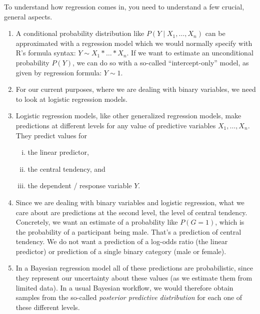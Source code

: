 \documentclass[nobib]{tufte-handout}
\begin{document}
To understand how regression comes in, you need to understand a few crucial, general aspects.
\begin{enumerate}[1.]

  \item A conditional probability distribution like $P(Y \mid X_{1}, \dots, X_{n})$ can be approximated with a regression model which we would normally specify with R's formula syntax: $Y \sim X_{1} * \dots * X_{n}$.
  If we want to estimate an unconditional probability $P(Y)$, we can do so with a so-called ``intercept-only'' model, as given by regression formula: $Y \sim 1$.

  \item For our current purposes, where we are dealing with binary variables, we need to look at logistic regression models.

  \item Logistic regression models, like other generalized regression models, make predictions at different levels for any value of predictive variables $X_{1}, \dots, X_{n}$.
  They predict values for
  \begin{enumerate}[(i)]
    \item the linear predictor,
    \item the central tendency, and
    \item the dependent / response variable $Y$.
  \end{enumerate}

  \item Since we are dealing with binary variables and logistic regression, what we care about are predictions at the second level, the level of central tendency.
  Concretely, we want an estimate of a probability like $P(G=1)$, which is the probability of a participant being male.
  That's a prediction of central tendency.
  We do not want a prediction of a log-odds ratio (the linear predictor) or prediction of a single binary category (male or female).

  \item In a Bayesian regression model all of these predictions are probabilistic, since they represent our uncertainty about these values (as we estimate them from limited data).
  In a usual Bayesian workflow, we would therefore obtain samples from the so-called \textit{posterior predictive distribution} for each one of these different levels.

\end{enumerate}
\end{document}
